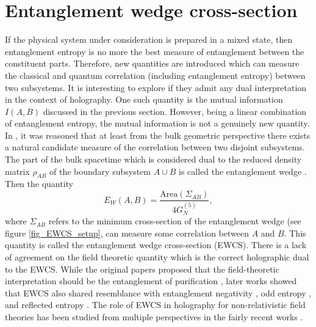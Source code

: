 \documentclass[12pt,a4paper]{article}
\numberwithin{equation}{section}
\begin{document}

\section{Entanglement wedge cross-section} \label{sec4}

If the physical system under consideration is prepared in a mixed state, then entanglement entropy is no more the best measure of entanglement between the constituent parts. Therefore, new quantities are introduced which can measure the classical and quantum correlation (including entanglement entropy) between two subsystems. It is interesting to explore if they admit any dual interpretation in the context of holography. One such quantity is the mutual information $I\left(A, B\right)$ discussed in the previous section. However, being a linear combination of entanglement entropy, the mutual information is not a genuinely new quantity. In \cite{Takayanagi:2017knl}, it was reasoned that at least from the bulk geometric perspective there exists a natural candidate measure of the correlation between two disjoint subsystems. The part of the bulk spacetime which is considered dual to the reduced density matrix $\rho_{AB}$ of the boundary subsystem $A\cup B$ is called the entanglement wedge \cite{Wall:2012uf, Czech:2012bh, Headrick:2014cta}. Then the quantity
\begin{equation} \label{EWCS_defn}
	E_{W} \left(A, B\right) = \frac{\text{Area}\left(\Sigma_{AB}\right)}{4 G_N^{(5)}},
\end{equation}
where $\Sigma_{AB}$ refers to the minimum cross-section of the entanglement wedge (see figure \ref{fig_EWCS_setup}, can measure some correlation between $A$ and $B$. This quantity is called the entanglement wedge cross-section (EWCS). There is a lack of agreement on the field theoretic quantity which is the correct holographic dual to the EWCS. While the original papers proposed that the field-theoretic interpretation should be the entanglement of purification \cite{Takayanagi:2017knl, Nguyen:2017yqw}, later works showed that EWCS also shared resemblance with entanglement negativity \cite{Kudler-Flam:2018qjo, Kusuki:2019zsp}, odd entropy \cite{Tamaoka:2018ned}, and reflected entropy \cite{Dutta:2019gen}. The role of EWCS in holography for non-relativistic field theories has been studied from multiple perspectives in the fairly recent works \cite{BabaeiVelni:2019pkw, Gong:2020pse, Khoeini-Moghaddam:2020ymm, Vasli:2022kfu, BabaeiVelni:2023cge}.
\end{document}
